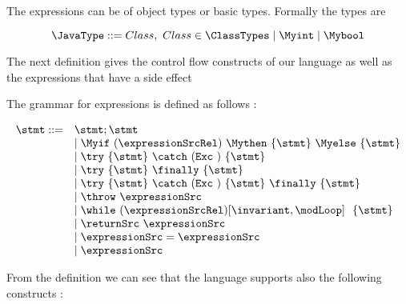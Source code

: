 The expressions can be of object types or basic types. Formally the types are 

$$
\JavaType ::= Class, \ Class \in \ClassTypes \mid \Myint \mid \Mybool
$$ 


The next definition gives the control flow constructs of our language as well as the expressions that have a side 
effect  
\begin{Statement}[Statement]
    The grammar for expressions  is defined as follows :
\end{Statement}
    $$ \begin{array} {ll}    \stmt ::=  
                                & \stmt;\stmt \\
                                & \mid \Myif \ (\expressionSrcRel) \ \Mythen \ \{ \stmt \} \  \Myelse \ \{ \stmt \}  \\
			        & \mid \try  \ \{ \stmt \}  \ \catch \ ( \mbox{\rm\texttt{Exc} } )\ \{ \stmt \} \\
		                & \mid \try  \ \{ \stmt \} \ \finally \ \{ \stmt \} \\
				& \mid \try  \ \{ \stmt \} \ \catch \ ( \mbox{\rm\texttt{Exc} }  )\ \{ \stmt \} \ \finally \ \{ \stmt \} \\
				& \mid \throw \ \expressionSrc  \\
                                & \mid \while \ (\expressionSrcRel) \lbrack \invariant, \modLoop \rbrack \ \do \ \{ \stmt \} \\
				& \mid \returnSrc \  \expressionSrc \\
                   		& \mid \expressionSrc = \expressionSrc \\
				& \mid \expressionSrc \\
			
			 \end{array} 
    $$



From the definition we can see that the language supports also the following constructs :

